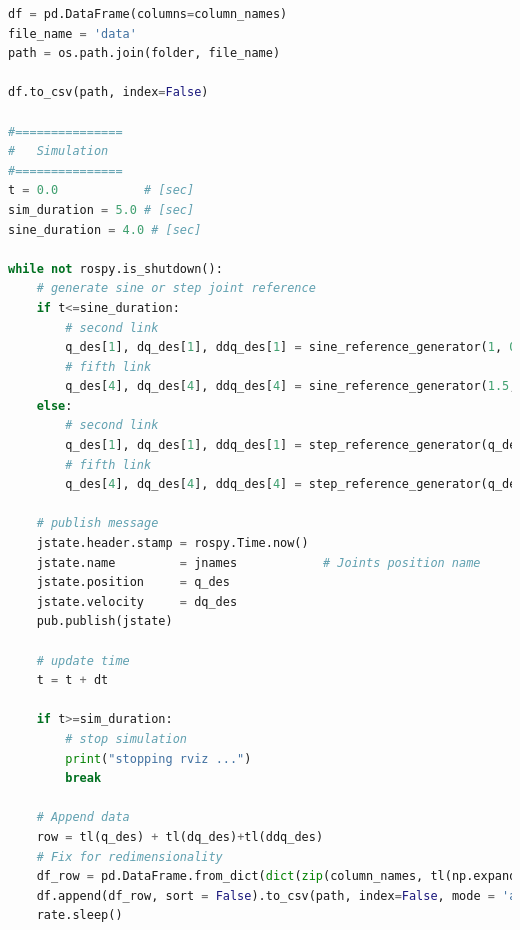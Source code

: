 \documentclass[12pt, a4paper]{article}
\begin{document}
\begin{lstlisting}[language=Python,caption=Main code.]
df = pd.DataFrame(columns=column_names)
file_name = 'data'
path = os.path.join(folder, file_name)

df.to_csv(path, index=False) 

#===============
#   Simulation
#===============
t = 0.0            # [sec] 
sim_duration = 5.0 # [sec]
sine_duration = 4.0 # [sec]

while not rospy.is_shutdown():
    # generate sine or step joint reference
    if t<=sine_duration:
        # second link
        q_des[1], dq_des[1], ddq_des[1] = sine_reference_generator(1, 0.2, t)
        # fifth link
        q_des[4], dq_des[4], ddq_des[4] = sine_reference_generator(1.5, 0.4, t)
    else:
        # second link
        q_des[1], dq_des[1], ddq_des[1] = step_reference_generator(q_des[1])
        # fifth link
        q_des[4], dq_des[4], ddq_des[4] = step_reference_generator(q_des[4])

    # publish message
    jstate.header.stamp = rospy.Time.now()
    jstate.name 		= jnames			# Joints position name
    jstate.position 	= q_des
    jstate.velocity 	= dq_des
    pub.publish(jstate)

    # update time
    t = t + dt
    
    if t>=sim_duration:
        # stop simulation
        print("stopping rviz ...")
        break

    # Append data
    row = tl(q_des) + tl(dq_des)+tl(ddq_des)
    # Fix for redimensionality
    df_row = pd.DataFrame.from_dict(dict(zip(column_names, tl(np.expand_dims(np.array(row), axis = 1)))))
    df.append(df_row, sort = False).to_csv(path, index=False, mode = 'a', header=False)     
    rate.sleep()
\end{lstlisting}
\end{document}
